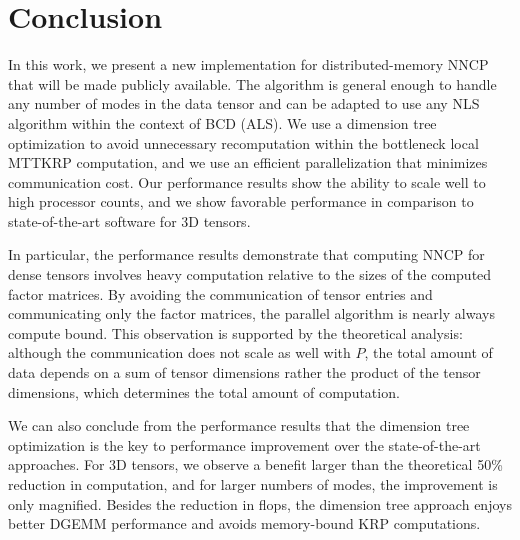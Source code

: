 
\section{Conclusion} \label{sec:conclusion}

In this work, we present a new implementation for distributed-memory NNCP that will be made publicly available.
The algorithm is general enough to handle any number of modes in the data tensor and can be adapted to use any NLS algorithm within the context of BCD (ALS).
We use a dimension tree optimization to avoid unnecessary recomputation within the bottleneck local MTTKRP computation, and we use an efficient parallelization that minimizes communication cost.
Our performance results show the ability to scale well to high processor counts, and we show favorable performance in comparison to state-of-the-art software for 3D tensors.

In particular, the performance results demonstrate that computing NNCP for dense tensors involves heavy computation relative to the sizes of the computed factor matrices.
By avoiding the communication of tensor entries and communicating only the factor matrices, the parallel algorithm is nearly always compute bound.
This observation is supported by the theoretical analysis: although the communication does not scale as well with $P$, the total amount of data depends on a sum of tensor dimensions rather the product of the tensor dimensions, which determines the total amount of computation.

We can also conclude from the performance results that the dimension tree optimization is the key to performance improvement over the state-of-the-art approaches.
For 3D tensors, we observe a benefit larger than the theoretical 50\% reduction in computation, and for larger numbers of modes, the improvement is only magnified.
Besides the reduction in flops, the dimension tree approach enjoys better DGEMM performance and avoids memory-bound KRP computations.

